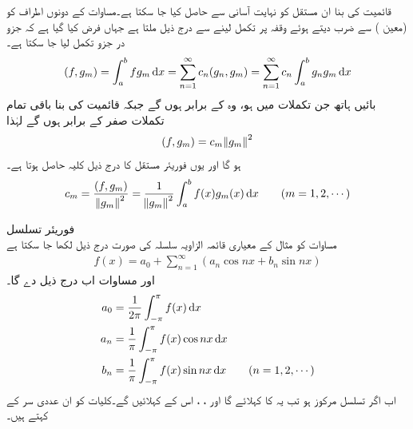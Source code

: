 قائمیت کی بنا ان مستقل کو نہایت آسانی سے حاصل کیا جا سکتا ہے۔مساوات  کے دونوں اطراف کو  (معین  ) سے ضرب دیتے ہوئے وقفہ  پر تکمل لینے سے درج ذیل ملتا ہے جہاں فرض کیا گیا ہے کہ جزو در جزو تکمل لیا جا سکتا ہے۔ 
\begin{align*}
(f,g_m)=\int_{a}^{b}fg_m\dif x=\sum_{n=1}^{\infty} c_n(g_n,g_m)=\sum_{n=1}^{\infty} c_n\int_{a}^{b} g_n g_m \dif x
\end{align*}
بائیں ہاتھ جن تکملات میں  ہو، وہ   کے برابر ہوں گے جبکہ قائمیت کی بنا  باقی تمام تکملات صفر کے برابر ہوں گے لہٰذا
\begin{align}\label{مساوات_طاقتی_اضافی_فوریئر_عمومی_ب}
(f,g_m)=c_m\norm{g_m}^2
\end{align}
ہو گا اور یوں فوریئر مستقل کا درج ذیل کلیہ حاصل ہوتا ہے۔
\begin{align}\label{مساوات_طاقتی_اضافی_فوریئر_عمومی_پ}
c_m=\frac{(f,g_m)}{\norm{g_m}^2}=\frac{1}{\norm{g_m}^2}\int_{a}^{b} f(x)g_m(x)\dif x \quad \quad (m=1,2,\cdots)
\end{align}

\quad فوریئر تسلسل\\
مساوات  کو مثال  کے معیاری قائمہ الزاویہ سلسلہ کی صورت درج ذیل لکھا جا سکتا ہے
\begin{align}\label{مساوات_طاقتی_اضافی_فوریئر_عمومی_ت}
f(x)=a_0+\sum_{n=1}^{\infty}(a_n\cos nx+b_n\sin nx)
\end{align}
اور مساوات  اب درج ذیل دے گا۔
\begin{gather}
\begin{aligned}\label{مساوات_طاقتی_اضافی_فوریئر_عمومی_ٹ}
a_0&=\frac{1}{2\pi}\int_{-\pi}^{\pi} f(x)\dif x\\
a_n&=\frac{1}{\pi}\int_{-\pi}^{\pi} f(x)\cos nx \dif x\\
b_n&=\frac{1}{\pi}\int_{-\pi}^{\pi}f(x)\sin nx \dif x\quad \quad (n=1,2,\cdots)
\end{aligned}
\end{gather} 
اب اگر تسلسل  مرکوز ہو تب یہ  کا  کہلائے گا اور ، ،  اس کے  کہلائیں گے۔کلیات  کو ان عددی سر کے  کہتے ہیں۔

